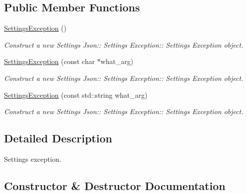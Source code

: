 \subsection*{Public Member Functions}
\begin{DoxyCompactItemize}
\item 
\mbox{\label{class_settings_json_1_1_settings_exception_a162cf0372d7de8ffa7c9c4ebdc92be49}} 
\hyperlink{class_settings_json_1_1_settings_exception_a162cf0372d7de8ffa7c9c4ebdc92be49}{Settings\+Exception} ()
\begin{DoxyCompactList}\small\item\em Construct a new Settings Json\+:\+: Settings Exception\+:\+: Settings Exception object. \end{DoxyCompactList}\item 
\hyperlink{class_settings_json_1_1_settings_exception_a067f8e95001fea3da660a71a805e775f}{Settings\+Exception} (const char $\ast$what\+\_\+arg)
\begin{DoxyCompactList}\small\item\em Construct a new Settings Json\+:\+: Settings Exception\+:\+: Settings Exception object. \end{DoxyCompactList}\item 
\hyperlink{class_settings_json_1_1_settings_exception_a085dab75cbd99e45934c8ba53074a33f}{Settings\+Exception} (const std\+::string what\+\_\+arg)
\begin{DoxyCompactList}\small\item\em Construct a new Settings Json\+:\+: Settings Exception\+:\+: Settings Exception object. \end{DoxyCompactList}\end{DoxyCompactItemize}


\subsection{Detailed Description}
Settings exception. 

\subsection{Constructor \& Destructor Documentation}
\mbox{\label{class_settings_json_1_1_settings_exception_a067f8e95001fea3da660a71a805e775f}} 
